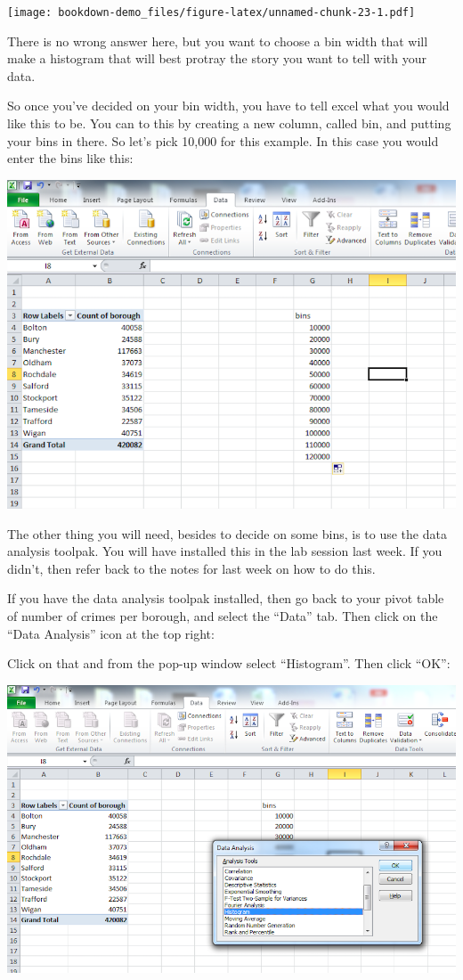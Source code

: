\documentclass[]{book}
\theoremstyle{definition}
\theoremstyle{definition}
\theoremstyle{definition}
\theoremstyle{remark}
\begin{document}
\texttt{[image: bookdown-demo\_files/figure-latex/unnamed-chunk-23-1.pdf]}

There is no wrong answer here, but you want to choose a bin width that
will make a histogram that will best protray the story you want to tell
with your data.

So once you've decided on your bin width, you have to tell excel what
you would like this to be. You can to this by creating a new column,
called bin, and putting your bins in there. So let's pick 10,000 for
this example. In this case you would enter the bins like this:

\includegraphics{imgs/bin_col.png}

The other thing you will need, besides to decide on some bins, is to use
the data analysis toolpak. You will have installed this in the lab
session last week. If you didn't, then refer back to the notes for last
week on how to do this.

If you have the data analysis toolpak installed, then go back to your
pivot table of number of crimes per borough, and select the ``Data''
tab. Then click on the ``Data Analysis'' icon at the top right:

\href{imgs/dat_loc.png}{}

Click on that and from the pop-up window select ``Histogram''. Then
click ``OK'':

\includegraphics{imgs/dat_pick_hist.png}
\end{document}
